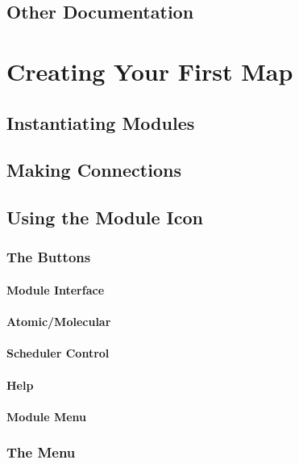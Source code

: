 \section{Other Documentation}




\chapter{Creating Your First Map}


\section{Instantiating Modules}


\section{Making Connections}


\section{Using the Module Icon}

\subsection{The Buttons}

\subsubsection{Module Interface}
\subsubsection{Atomic/Molecular}
\subsubsection{Scheduler Control}
\subsubsection{Help}
\subsubsection{Module Menu}

\subsection{The Menu}

